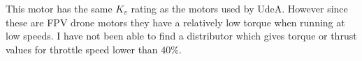 \documentclass[a4paper,8pt]{article}
\begin{document}
  This motor has the same \(K_v\) rating as the motors used by UdeA. However since these are FPV drone motors they have a relatively low torque when running at low speeds. I have not been able to find a distributor which gives torque or thrust values for throttle speed lower than \(40\%\).

%
%
%
%
%
%
%
%
%
%
%
\end{document}
